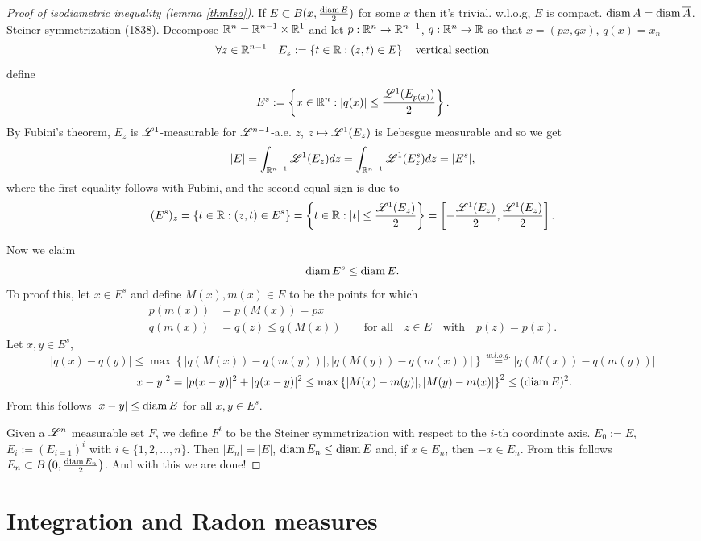 \begin{proof}[Proof of isodiametric inequality (lemma \ref{thmIso})]
If $E \subset B(x, \frac{\operatorname{diam} E}{2})$ for some $x$ then it's trivial.
w.l.o.g, $E$ is compact. $\operatorname{diam} A = \operatorname{diam} \overline{A}$.
Steiner symmetrization (1838). Decompose $\mathbb{R}^n = \mathbb{R}^{n-1}\times \mathbb{R}^1$ and let $p
: \mathbb{R}^n \to \mathbb{R}^{n-1}$, $q: \mathbb{R}^n \to \mathbb{R}$ so that $x = (px, qx)$, $q(x) = x_n$
\[
\forall z \in \mathbb{R}^{n-1} \quad E_z := \left\{t\in\mathbb{R} : (z,t) \in E\right\}
\quad \textnormal{vertical section}
\]
define
\[
E^s := \left\{ x \in \mathbb{R}^n: |q(x)| \leq \frac{\mathscr{L}^{1}(E_{p(x)})}{2}\right\}.
\]
By Fubini's theorem, $E_z$ is $\mathscr{L}^{1}$-measurable for
$\mathscr{L}^{n-1}$-a.e. $z$, $z \mapsto \mathscr{L}^{1}(E_z)$ is Lebesgue
measurable and so we get
\[
|E| = \int_{\mathbb{R}^{n-1}} \mathscr{L}^{1}(E_z) dz = \int_{\mathbb{R}^{n-1}}
\mathscr{L}^{1}(E_z^s) dz = |E^s|,
\]
where the first equality follows with Fubini,
and the second equal sign is due to 
\[
(E^s)_z = \{ t\in\mathbb{R} : (z,t) \in E^s \}
= \left\{ t\in \mathbb{R} : |t| \leq \frac{\mathscr{L}^{1}(E_z)}{2} \right\}
= \left[ - \frac{\mathscr{L}^{1}(E_z)}{2}, \frac{\mathscr{L}^{1}(E_z)}{2} \right].
\]

Now we claim 
$$\operatorname{diam} E^s \leq \operatorname{diam} E.$$ 
To proof this, let $x \in E^s$ and define $M(x), m(x)
\in E$ to be the points for which 
\[
\begin{aligned}
p(m(x)) &= p(M (x)) = px
\\
q(m(x)) &= q(z) \leq q(M(x))
\qquad \text{for all} \quad z \in E \quad \text{with} \quad p(z) = p(x).
\end{aligned}
\]
Let $x,y \in E^s$, 
\[
|q(x) - q(y)| \leq \max \left\{|q(M(x)) - q(m(y))|, |q(M(y)) - q(m(x))|\right\}
\overset{w.l.o.g.}{=} |q(M(x)) - q(m(y))|
\]
\[
|x-y|^2 = |p(x-y)|^2 + |q(x-y)|^2 \leq \max \left\{|M(x) - m(y)|, |M(y) -
m(x)|\right\}^2
\leq (\operatorname{diam} E)^2 .
\]
From this follows $|x - y| \leq \operatorname{diam} E$ for all $x,y \in E^s$.

Given a $\mathscr{L}^{n}$ measurable set $F$, we define $F^i$ to be the Steiner
symmetrization with respect to the $i$-th coordinate axis.
$E_0 := E$, $E_i := (E_{i=1})^i$ with $i \in \{1,2,\dots,n\}$. Then $|E_n| = |E|$,
$\operatorname{diam} E_n \leq \operatorname{diam} E$ and, if $x\in E_n$, then $-x \in E_n$. From this
follows $E_n \subset B\left(0,\frac{\operatorname{diam} E_n}{2}\right)$.
And with this we are done!
\end{proof}

\section{Integration and Radon measures}

